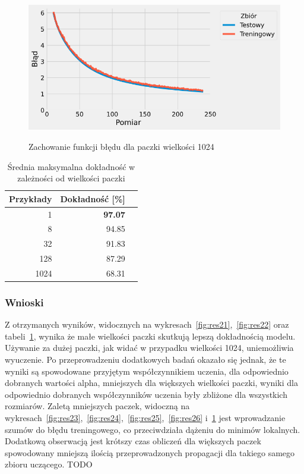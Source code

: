 \documentclass{article}
\begin{document}
\begin{figure}[H]
	\centering
	\caption{Zachowanie funkcji błędu dla paczki wielkości 1024}
	\includegraphics[width=\textwidth]{batch_err_1024.png}
	\label{fig:res27}
\end{figure}

\begin{table}[H]
	\caption{Średnia maksymalna dokładność w zależności od wielkości paczki}
	\label{tabela-res-21}
	\centering
	\begin{tabular}{rrr}
		\toprule
		Przykłady & Dokładność [\%] \\
		\midrule
		1          & \textbf{97.07}     \\
		8          & 94.85              \\
		32         & 91.83              \\
		128        & 87.29              \\
		1024       & 68.31              \\
		\bottomrule
	\end{tabular}
\end{table}

\subsubsection*{Wnioski}

Z otrzymanych wyników, widocznych na wykresach~\ref{fig:res21},~\ref{fig:res22} oraz tabeli~\ref{tabela-res-21}, wynika że małe wielkości paczki skutkują lepszą dokładnością modelu. Używanie za dużej paczki, jak widać w przypadku wielkości 1024, uniemożliwia wyuczenie. Po przeprowadzeniu dodatkowych badań okazało się jednak, że te wyniki są spowodowane przyjętym współczynnikiem uczenia, dla odpowiednio dobranych wartości alpha, mniejszych dla większych wielkości paczki, wyniki dla odpowiednio dobranych współczynników uczenia były zbliżone dla wszystkich rozmiarów. Zaletą mniejszych paczek, widoczną na wykresach~\ref{fig:res23},~\ref{fig:res24},~\ref{fig:res25},~\ref{fig:res26} i~\ref{fig:res27} jest wprowadzanie szumów do błędu treningowego, co przeciwdziała dążeniu do minimów lokalnych.
Dodatkową obserwacją jest krótszy czas obliczeń dla większych paczek spowodowany mniejszą ilością przeprowadzonych propagacji dla takiego samego zbioru uczącego.
TODO
\end{document}

